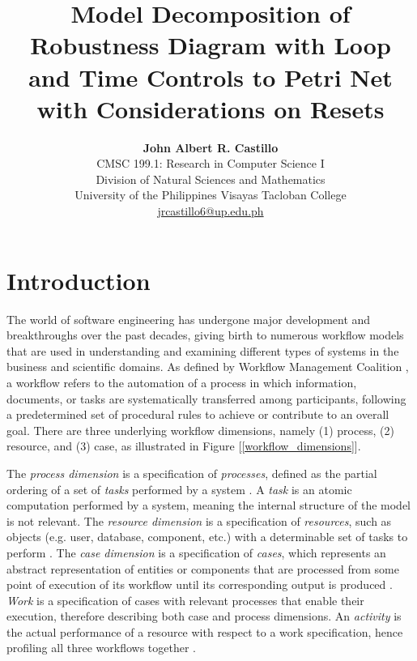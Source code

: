\documentclass[12pt]{article}
\title{\bf Model Decomposition of Robustness Diagram with Loop and Time Controls to Petri Net with Considerations on Resets}
\author{{\bf John Albert R. Castillo} \\
CMSC 199.1: Research in Computer Science I \\
Division of Natural Sciences and Mathematics \\
University of the Philippines Visayas Tacloban College \\
{\small \href{mailto:jrcastillo6@up.edu.ph}{jrcastillo6@up.edu.ph}}
}
\begin{document}
\maketitle
\thispagestyle{empty} %
\pagebreak

\tableofcontents
\pagebreak

\section{Introduction}
The world of software engineering has undergone major development and breakthroughs over the past decades, giving birth to numerous workflow models that are used in understanding and examining different types of systems in the business and scientific domains. As defined by Workflow Management Coalition \cite{workflow}, a workflow refers to the automation of a process in which information, documents, or tasks are systematically transferred among participants, following a predetermined set of procedural rules to achieve or contribute to an overall goal. There are three underlying workflow dimensions, namely (1) process, (2) resource, and (3) case, as illustrated in Figure [\ref{workflow_dimensions}]. \par

The \textit{process dimension} is a specification of \textit{processes}, defined as the partial ordering of a set of \textit{tasks} performed by a system \cite{malinao-rdlt}. A \textit{task} is an atomic computation performed by a system, meaning the internal structure of the model is not relevant. The \textit{resource dimension} is a specification of \textit{resources}, such as objects (e.g. user, database, component, etc.) with a determinable set of tasks to perform \cite{malinao-rdlt}. The \textit{case dimension} is a specification of \textit{cases}, which represents an abstract representation of entities or components that are processed from some point of execution of its workflow until its corresponding output is produced \cite{malinao-rdlt}. \textit{Work} is a specification of cases with relevant processes that enable their execution, therefore describing both case and process dimensions. An \textit{activity} is the actual performance of a resource with respect to a work specification, hence profiling all three workflows together \cite{malinao-rdlt}.
\end{document}
